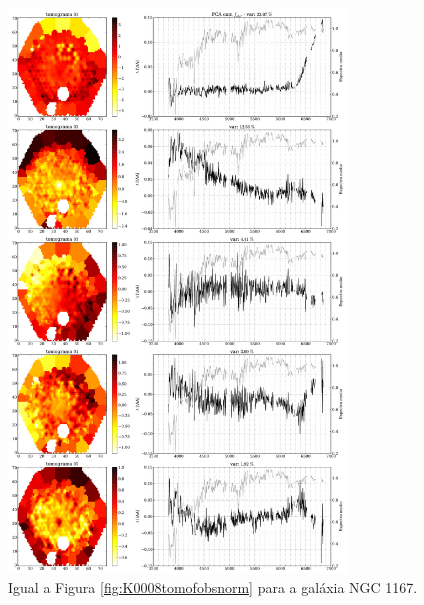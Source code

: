 \begin{figure}
    \includegraphics[width=0.8\textwidth]{figuras/K0119-tomo-obs-norm.pdf}
    \caption[Tomogramas de 1 a 5 para o cubo $f_{obs}$ - NGC 1167.]
    {Igual a Figura \ref{fig:K0008tomofobsnorm} para a galáxia NGC 1167.}
    \label{fig:K0119tomofobsnorm}
\end{figure}

